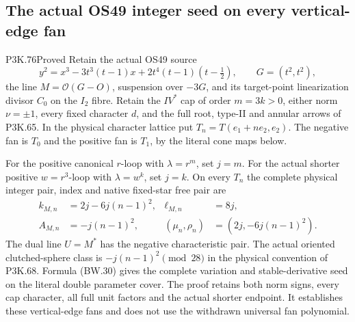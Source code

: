 \subsection{The actual OS49 integer seed on every vertical-edge fan}
\begin{statement}{P3K.76}{Proved}
Retain the actual OS49 source
\[
y^2=x^3-3t^3(t-1)x+2t^4(t-1)(t-\tfrac12),\qquad G=(t^2,t^2),
\]
the line \(M=\mathcal O(G-O)\), suspension over \(-3G\), and
its target-point linearization divisor \(C_0\) on the \(I_2\) fibre.
Retain the \(IV^*\) cap of order \(m=3k>0\), either norm
\(\nu=\pm1\), every fixed character \(d\), and the full root,
type-II and annular arrows of P3K.65. In the physical character
lattice put \(T_n=T(e_1+ne_2,e_2)\). The negative fan is \(T_0\)
and the positive fan is \(T_1\), by the literal cone maps below.

For the positive canonical \(r\)-loop with \(\lambda=r^m\), set
\(j=m\). For the actual shorter positive \(w=r^3\)-loop with
\(\lambda=w^k\), set \(j=k\). On every \(T_n\) the complete
physical integer pair, index and native fixed-star free pair are
\[
\begin{aligned}
k_{M,n}&=2j-6j(n-1)^2,&\ell_{M,n}&=8j,\\
A_{M,n}&=-j(n-1)^2,&
(\mu_n,\rho_n)&=(2j,-6j(n-1)^2).
\end{aligned}
\]
The dual line \(U=M^*\) has the negative characteristic pair.
The actual oriented clutched-sphere class is
\(-j(n-1)^2\pmod {28}\) in the physical convention of P3K.68.
Formula (BW.30) gives the complete variation and stable-derivative
seed on the literal double parameter cover. The proof retains
both norm signs, every cap character, all full unit factors and
the actual shorter endpoint. It establishes these vertical-edge
fans and does not use the withdrawn universal fan polynomial.
\end{statement}
